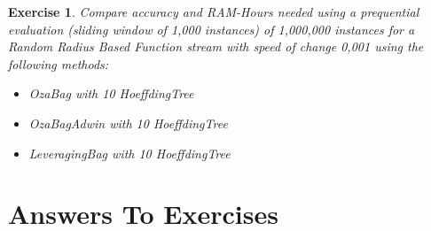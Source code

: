 \documentclass[a4paper,12pt]{article}
\newtheorem{exercise}{Exercise}{}
\begin{document}
\begin{exercise}
Compare accuracy and RAM-Hours needed using a prequential evaluation (sliding window of 1,000 instances) of 1,000,000 instances for a Random Radius Based Function stream with speed of change 0,001 using the following methods:
\begin{itemize}
 \item OzaBag with 10 HoeffdingTree
 \item OzaBagAdwin with 10 HoeffdingTree
 \item LeveragingBag with 10 HoeffdingTree
\end{itemize}
\end{exercise}

\section{Answers To Exercises}
\end{document}
